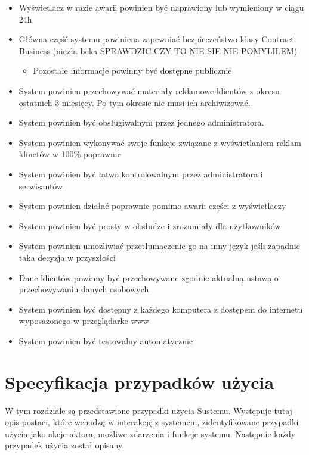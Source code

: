 \documentclass[10pt,a4paper,titlepage]{article} %
\begin{document}
\begin{enumerate}
				\begin{itemize}
					\item Wyświetlacz w razie awarii powinien być naprawiony lub wymieniony w
					ciągu 24h
					\item Główna część systemu powiniena zapewniać bezpieczeństwo klasy
					  Contract Business (niezła beka SPRAWDZIC CZY TO NIE SIE NIE POMYLILEM)
						 \begin{itemize}
					      \item Pozostałe informacje powinny być dostępne publicznie
					     \end{itemize}
					\item System powinien przechowywać materiały reklamowe klientów z okresu
					    ostatnich 3 miesięcy. Po tym okresie nie musi ich archiwizować.
					\item System powinien być obsługiwalnym przez jednego administratora.
					\item System powinien wykonywać swoje funkcje związane z wyświetlaniem
					    reklam klinetów w 100\% poprawnie
					\item System powinien być łatwo kontrolowalnym przez administratora i
						 serwisantów
					\item System powinien działać poprawnie pomimo awarii części z
						  wyświetlaczy
					\item System powinien być prosty w obsłudze i zrozumiały dla użytkowników
					\item System powinien umożliwiać przetłumaczenie go na inny język jeśli
					     zapadnie taka decyzja w przyszłości
					\item Dane klientów powinny być przechowywane zgodnie aktualną ustawą o
					     przechowywaniu danych osobowych
					\item System powinien być dostępny z każdego komputera z dostępem do
					     internetu wyposażonego w przeglądarke www
					\item System powinien być testowalny automatycznie
				\end{itemize}
		   \end{enumerate}
		  
	
	
	\section{Specyfikacja przypadków użycia}	
	
		W tym rozdziale są przedstawione przypadki użycia Sustemu. Występuje tutaj opis postaci, które wchodzą w interakcję z systemem,
		zidentyfikowane przypadki użycia jako akcje aktora, możliwe zdarzenia i funkcje systemu. Następnie każdy przypadek użycia został opisany.\\
\end{document}

